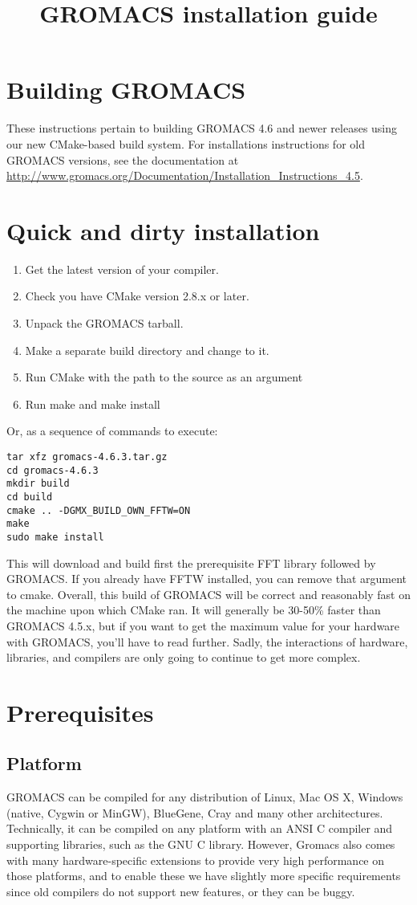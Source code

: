 \documentclass{article}[12pt,a4paper,twoside]
\title{GROMACS installation guide}
\newcommand{\gromacs}{GROMACS}
\newcommand{\cmake}{CMake}
\begin{document}
\section{Building GROMACS}

These instructions pertain to building \gromacs{} 4.6 and newer releases
using our new CMake-based build system. 
For installations instructions for old \gromacs{} versions,
see the documentation at
\url{http://www.gromacs.org/Documentation/Installation_Instructions_4.5}.

\section{Quick and dirty installation}

\begin{enumerate}
\item Get the latest version of your compiler.
\item Check you have \cmake{} version 2.8.x or later.
\item Unpack the \gromacs{} tarball.
\item Make a separate build directory and change to it. 
\item Run \cmake{} with the path to the source as an argument
\item Run make and make install
\end{enumerate}
Or, as a sequence of commands to execute:
\begin{verbatim}
tar xfz gromacs-4.6.3.tar.gz
cd gromacs-4.6.3
mkdir build
cd build
cmake .. -DGMX_BUILD_OWN_FFTW=ON
make
sudo make install
\end{verbatim}
This will download and build first the prerequisite FFT library followed by \gromacs{}. If you already have
FFTW installed, you can remove that argument to cmake. Overall, this build 
of \gromacs{} will be correct and reasonably fast on the
machine upon which \cmake{} ran. It will generally be 30-50\% faster
than \gromacs{} 4.5.x, but if you want to get the maximum value
for your hardware with \gromacs{}, you'll have to read further.
Sadly, the interactions of hardware, libraries, and compilers
are only going to continue to get more complex. 

\section{Prerequisites}
\subsection{Platform}
\gromacs{} can be compiled for any distribution of Linux, Mac OS X,
Windows (native, Cygwin or MinGW), BlueGene, Cray and many other architectures.
Technically, it can be compiled on any platform with an ANSI C
compiler and supporting libraries, such as the GNU C library. However, Gromacs
also comes with many hardware-specific extensions to provide very high performance
on those platforms, and to enable these we have slightly more specific requirements
since old compilers do not support new features, or they can be buggy.
\end{document}
